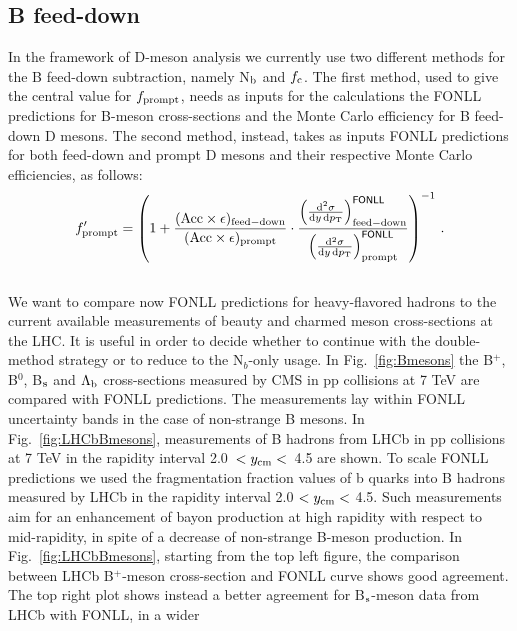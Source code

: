 \subsection{B feed-down}
In the framework of D-meson analysis we currently use two different 
methods for the B feed-down subtraction, namely N$_{\rm b}$ and $f_{\rm c}$. 
The first method, used to give the central value for $f_{\rm prompt}$, 
needs as inputs for the calculations the FONLL predictions
for B-meson cross-sections and the Monte Carlo efficiency for B feed-down 
D mesons.
The second method, instead, takes as inputs FONLL predictions for both 
feed-down and prompt D mesons and their respective Monte Carlo efficiencies, 
as follows:\\
\begin{equation}
f^\prime_{\rm prompt} = \left( 	1 + 	\frac{({\rm Acc}\times\epsilon)_{{\rm feed-down}}}{({\rm Acc}\times\epsilon)_{{\rm prompt}}}	\cdot
		 \frac{ \left(\frac{{\rm d}^2 \sigma}{{\rm d}y \, {\rm d} p_{\rm T} } \right)^{{\sf FONLL}}_{{\rm feed-down}} }{ \left(\frac{{\rm d}^2 \sigma}{{\rm d}y \, {\rm d} p_{\rm T} } \right)^{{\sf FONLL}}_{ {\rm prompt} } } 
\right)^{-1} \, .
\label{eq:fc}
\end{equation}
\\We want to compare now FONLL predictions for heavy-flavored hadrons
 to the current available measurements of beauty and charmed 
 meson cross-sections at the LHC.
It is useful in order to decide whether to continue with the 
double-method strategy or to reduce to the N$_{b}$-only usage.
In Fig.~\ref{fig:Bmesons} the B$^{+}$, B$^{0}$, B$_{\rm s}$ and 
$\Lambda_{\rm b}$ cross-sections measured by CMS in pp collisions at 7 TeV
are compared with FONLL predictions.
The measurements lay within FONLL uncertainty bands in the case 
of non-strange B mesons. 
In Fig.~\ref{fig:LHCbBmesons}, measurements of B hadrons from 
LHCb in pp collisions at 7 TeV in the rapidity interval 
\mbox{2.0 $< y_{\rm cm} <$ 4.5}  are shown.
To scale FONLL predictions we used the fragmentation fraction values 
of b quarks into B hadrons measured by LHCb in the rapidity interval 
2.0 $< y_{\rm cm} <$ 4.5. Such measurements aim for an 
enhancement of bayon production at high rapidity with respect to 
mid-rapidity, in spite of a decrease of non-strange B-meson production. 
In Fig.~\ref{fig:LHCbBmesons}, starting from the top left figure, the 
comparison between LHCb B$^{+}$-meson cross-section and FONLL
 curve shows good agreement.
The top right plot shows instead a better agreement for 
B$_{\rm s}$-meson data from LHCb with FONLL, in a wider 
